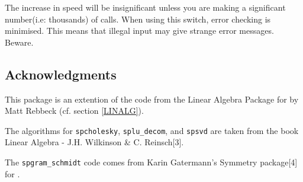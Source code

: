 The increase in speed will be insignificant unless you are making a 
significant number(i.e: thousands) of calls. When using this switch, 
error checking is minimised. This means that illegal input may give
strange error messages. Beware.

\subsection{Acknowledgments}
This package is an extention of the code from the Linear Algebra Package
for \REDUCE{} by Matt Rebbeck (cf. section \ref{LINALG}).

The algorithms for \texttt{spcholesky}, \texttt{splu\_decom}, and \texttt{spsvd} are 
taken from the book Linear Algebra - J.H. Wilkinson \& C. Reinsch[3].

The \texttt{spgram\_schmidt} code comes from Karin Gatermann's Symmetry 
package[4] for {\REDUCE}.
